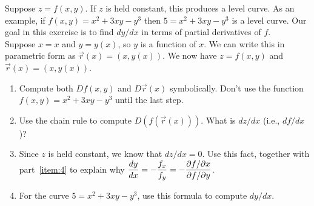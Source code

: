 \begin{problem}
%
\indent Suppose $z=f(x,y)$.  If $z$ is held constant, this produces a level curve. As an example, if $f(x,y) = x^2+3xy-y^3$ then $5=x^2+3xy-y^3$ is a level curve. Our goal in this exercise is to find $dy/dx$ in terms of partial derivatives of $f$.\\
\indent Suppose $x=x$ and $y=y(x)$, so $y$ is a function of $x$.  We can write this in parametric form as $\vec r(x) = (x,y(x))$. We now have $z=f(x,y)$ and $\vec r(x)=(x,y(x))$.
\begin{enumerate}
 \item Compute both $Df(x,y)$ and $D\vec r(x)$ symbolically.  Don't use the function $f(x,y)=x^2+3xy-y^3$ until the last step. 
 \item\label{item:4} Use the chain rule to compute $D(f(\vec r(x)))$. What is $dz/dx$ (i.e., $df/dx$)?
 \item Since $z$ is held constant, we know that $dz/dx=0$. Use this fact, together with part~\ref{item:4} to explain why $\displaystyle \frac{dy}{dx} = -\frac{f_x}{f_y} = -\frac{\partial f/ \partial x}{\partial f/ \partial y}$.
 \item For the curve $5=x^2+3xy-y^3$, use this formula to compute $dy/dx$.
\end{enumerate}

\end{problem}




